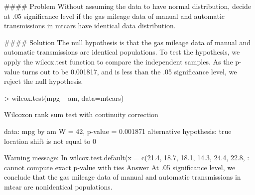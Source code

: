 #### Problem
Without assuming the data to have normal distribution, decide at .05 significance level if the gas mileage data of manual and automatic transmissions in mtcars have identical data distribution.

#### Solution
The null hypothesis is that the gas mileage data of manual and automatic transmissions are identical populations. To test the hypothesis, we apply the wilcox.test function to compare the independent samples. As the p-value turns out to be 0.001817, and is less than the .05 significance level, we reject the null hypothesis.

> wilcox.test(mpg ~ am, data=mtcars) 
 
        Wilcoxon rank sum test with continuity correction 
 
data:  mpg by am 
W = 42, p-value = 0.001871 
alternative hypothesis: true location shift is not equal to 0 
 
Warning message: 
In wilcox.test.default(x = c(21.4, 18.7, 18.1, 14.3, 24.4, 22.8,  : 
  cannot compute exact p-value with ties
Answer
At .05 significance level, we conclude that the gas mileage data of manual and automatic transmissions in mtcar are nonidentical populations.

